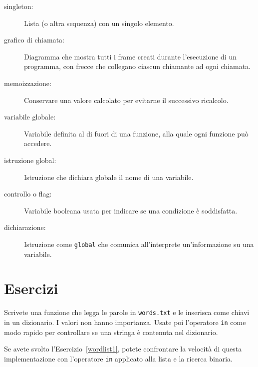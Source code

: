 \documentclass[10pt]{book}
\begin{document}
\begin{description}
\item[singleton:] Lista (o altra sequenza) con un singolo elemento.

\item[grafico di chiamata:] Diagramma che mostra tutti i frame creati durante l'esecuzione di un programma, con frecce che collegano ciascun chiamante ad ogni chiamata.

\item[memoizzazione:] Conservare una valore calcolato per evitarne il successivo ricalcolo.

\item[variabile globale:]  Variabile definita al di fuori di una funzione, alla quale ogni funzione può accedere.

\item[istruzione global:]  Istruzione che dichiara globale il nome di una variabile.

\item[controllo o flag:] Variabile booleana usata per indicare se una condizione è soddisfatta.

\item[dichiarazione:] Istruzione come {\tt global} che comunica all'interprete un'informazione su una variabile.

\end{description}

\section{Esercizi}


\begin{exercise}
\label{wordlist2}

Scrivete una funzione che legga le parole in {\tt words.txt} e le inserisca come chiavi in un dizionario. I valori non hanno importanza. Usate poi l'operatore {\tt in} come modo rapido per controllare se una stringa è contenuta nel dizionario.

Se avete svolto l'Esercizio~\ref{wordlist1}, potete confrontare la velocità di questa implementazione con l'operatore {\tt in} applicato alla lista e la ricerca binaria.

\end{exercise}
\end{document}
